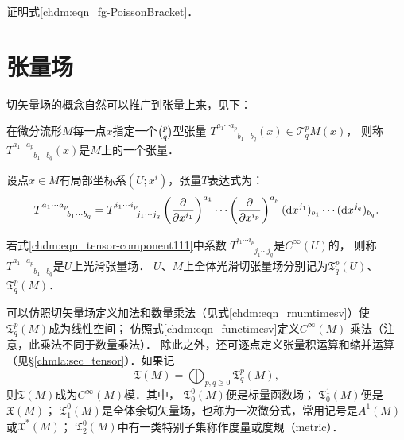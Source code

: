 \begin{exercise}
	证明式\eqref{chdm:eqn_fg-PoissonBracket}．
\end{exercise}

\section{张量场}\label{chdm:sec_tensor-fields}
切矢量场的概念自然可以推广到张量上来，见下：
\begin{definition}\label{chdm:def_tensor-field}
    在微分流形$M$每一点$x$指定一个$\binom{p}{q}$型张量
    $T^{a_1\cdots a_p}_{\phantom{a_1 \cdots a_p}b_1\cdots b_q}(x)\in \mathcal{T}^{p}_{q} M (x)$，
    则称$T^{a_1\cdots a_p}_{\phantom{a_1 \cdots a_p}b_1\cdots b_q}(x)$是$M$上的一个{\heiti 张量}．
\end{definition}
设点$x\in M$有局部坐标系$(U;x^i)$，张量$T$表达式为：
\begin{equation}\label{chdm:eqn_tensor-component111}
    T^{a_1 \cdots a_p}_{\phantom{a_1 \cdots a_p}b_1\cdots b_q} 
    = T^{i_1 \cdots i_p}_{\phantom{i_1 \cdots i_p}j_1\cdots j_q} 
    \left(\frac{\partial }{\partial x^{i_1}}\right)^{a_1} \cdots 
    \left(\frac{\partial }{\partial x^{i_p}}\right)^{a_p} 
    ({\rm d}x^{j_1})_{b_1} \cdots  ({\rm d}x^{j_q})_{b_q}    .
\end{equation}

\begin{definition}
    若式\eqref{chdm:eqn_tensor-component111}中系数
    $T^{i_1 \cdots i_p}_{\phantom{i_1 \cdots i_p}j_1\cdots j_q}$是$C^\infty(U)$的，
    则称$T^{a_1\cdots a_p}_{\phantom{a_1 \cdots a_p}b_1\cdots b_q}$是$U$上{\heiti 光滑张量场}．
    $U$、$M$上全体光滑切张量场分别记为$\mathfrak{T}^p_q(U)$、$\mathfrak{T}^p_q(M)$．
\end{definition}
可以仿照切矢量场定义加法和数量乘法（见式\eqref{chdm:eqn_rnumtimesv}）使$\mathfrak{T}^p_q(M)$成为线性空间；
仿照式\eqref{chdm:eqn_functimesv}定义$C^\infty(M)$-乘法（注意，此乘法不同于数量乘法）．
除此之外，还可逐点定义张量积运算和缩并运算（见\S \ref{chmla:sec_tensor}）．如果记
\begin{equation}
    \mathfrak{T}(M) = \bigoplus_{p,q \geqslant 0} \mathfrak{T}^p_q(M),
\end{equation}
则$\mathfrak{T}(M)$成为$C^\infty(M)$模．其中，
$\mathfrak{T}^{0}_{0}(M)$便是标量函数场；
$\mathfrak{T}^{1}_{0}(M)$便是$\mathfrak{X}(M)$；
$\mathfrak{T}^{0}_{1}(M)$是全体余切矢量场，也称为{\heiti 一次微分式}，常用记号是${A}^{1}(M)$或$\mathfrak{X}^*(M)$；
$\mathfrak{T}^{0}_{2}(M)$中有一类特别子集称作{\heiti 度量}或{\heiti 度规}（metric）．

